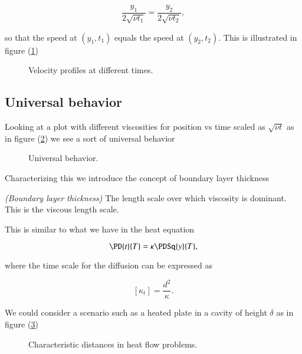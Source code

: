 \begin{equation}\label{eqn:continuumL17:180}
\frac{y_1}{2 \sqrt{\nu t_1}} = \frac{y_2}{2 \sqrt{\nu t_2}},
\end{equation}

so that the speed at $(y_1, t_1)$ equals the speed at $(y_2, t_2)$.  This is illustrated in figure (\ref{fig:continuumL17:continuumL17Fig3})
\begin{figure}[htp]
   \centering
   \def\svgwidth{0.6\columnwidth}
   
   \caption{Velocity profiles at different times.}\label{fig:continuumL17:continuumL17Fig3}
\end{figure}

\subsection{Universal behavior}

Looking at a plot with different viscosities for position vs time scaled as $\sqrt{\nu t}$ as in figure (\ref{fig:continuumL17:continuumL17Fig4}) we see a sort of universal behavior

\begin{figure}[htp]
   \centering
   \def\svgwidth{0.6\columnwidth}
   
   \caption{Universal behavior.}\label{fig:continuumL17:continuumL17Fig4}
\end{figure}

Characterizing this we introduce the concept of boundary layer thickness

\begin{definition}
\emph{(Boundary layer thickness)}
\label{dfn:continuumL17:200}
The length scale over which viscosity is dominant.  This is the viscous length scale.
\end{definition}

This is similar to what we have in the heat equation 

\begin{equation}\label{eqn:continuumL17:220}
\PD{t}{T} = \kappa \PDSq{y}{T},
\end{equation}

where the time scale for the diffusion can be expressed as

\begin{equation}\label{eqn:continuumL17:240}
[\kappa_t] = \frac{d^2}{\kappa}.
\end{equation}

We could consider a scenario such as a heated plate in a cavity of height $\delta$ as in figure (\ref{fig:continuumL17:continuumL17Fig5})
\begin{figure}[htp]
   \centering
   \def\svgwidth{0.5\columnwidth}
   
   \caption{Characteristic distances in heat flow problems.}\label{fig:continuumL17:continuumL17Fig5}
\end{figure}

